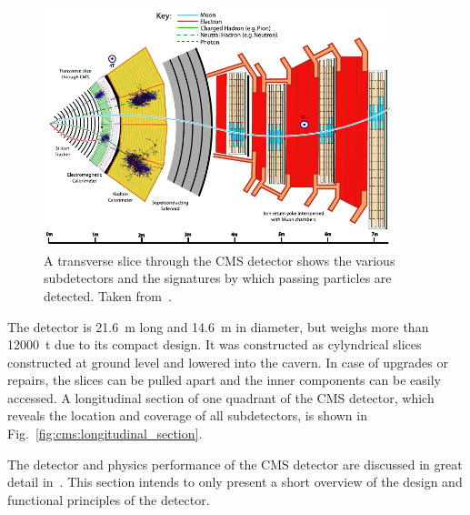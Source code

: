 \begin{figure}[htp]
    \centering
    \includegraphics[width=0.9\textwidth]{figures/experimental_setup/cms_slice.pdf}
    \caption[Transverse slice of the CMS detector]{A transverse slice through the
        CMS detector shows the various subdetectors and the signatures by which
        passing particles are detected. Taken from~\cite{Barney:2120661}.}
    \label{fig:cms:transverse_slice}
\end{figure}

The detector is \SI{21.6}{\meter} long and \SI{14.6}{\meter} in diameter, but
weighs more than \SI{12000}{\tonne} due to its compact design. It was
constructed as cylyndrical slices constructed at ground level and lowered into
the cavern. In case of upgrades or repairs, the slices can be pulled apart and
the inner components can be easily accessed. A longitudinal section of one
quadrant of the CMS detector, which reveals the location and coverage of all
subdetectors, is shown in Fig.~\ref{fig:cms:longitudinal_section}.

The detector and physics performance of the CMS detector are discussed in great
detail in~\cite{Bayatian:922757,Ball:2007zza,Chatrchyan:2008aa}. This section
intends to only present a short overview of the design and functional principles
of the detector.

